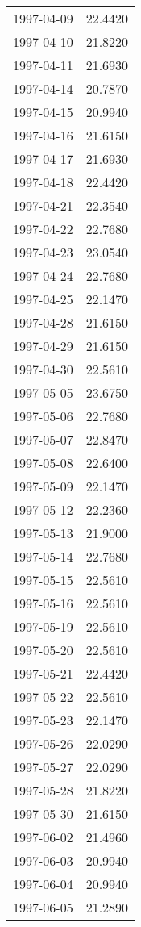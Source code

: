 \begin{tabular}{lr}
1997-04-09 &     22.4420 \\
1997-04-10 &     21.8220 \\
1997-04-11 &     21.6930 \\
1997-04-14 &     20.7870 \\
1997-04-15 &     20.9940 \\
1997-04-16 &     21.6150 \\
1997-04-17 &     21.6930 \\
1997-04-18 &     22.4420 \\
1997-04-21 &     22.3540 \\
1997-04-22 &     22.7680 \\
1997-04-23 &     23.0540 \\
1997-04-24 &     22.7680 \\
1997-04-25 &     22.1470 \\
1997-04-28 &     21.6150 \\
1997-04-29 &     21.6150 \\
1997-04-30 &     22.5610 \\
1997-05-05 &     23.6750 \\
1997-05-06 &     22.7680 \\
1997-05-07 &     22.8470 \\
1997-05-08 &     22.6400 \\
1997-05-09 &     22.1470 \\
1997-05-12 &     22.2360 \\
1997-05-13 &     21.9000 \\
1997-05-14 &     22.7680 \\
1997-05-15 &     22.5610 \\
1997-05-16 &     22.5610 \\
1997-05-19 &     22.5610 \\
1997-05-20 &     22.5610 \\
1997-05-21 &     22.4420 \\
1997-05-22 &     22.5610 \\
1997-05-23 &     22.1470 \\
1997-05-26 &     22.0290 \\
1997-05-27 &     22.0290 \\
1997-05-28 &     21.8220 \\
1997-05-30 &     21.6150 \\
1997-06-02 &     21.4960 \\
1997-06-03 &     20.9940 \\
1997-06-04 &     20.9940 \\
1997-06-05 &     21.2890 \\

\end{tabular}
